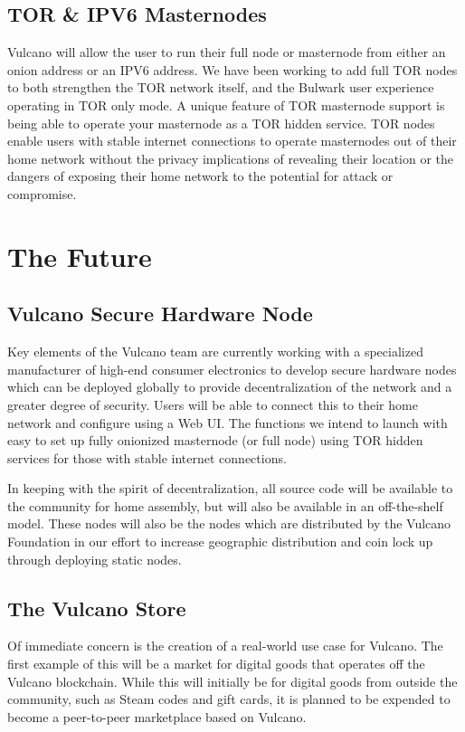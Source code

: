\documentclass[A4paper, 12pt]{article}
\begin{document}
\subsection{TOR \& IPV6 Masternodes}
Vulcano will allow the user to run their full node or masternode from either an onion address or an IPV6 address. We have been working to add full TOR nodes to both strengthen the TOR network itself, and the Bulwark user experience operating in TOR only mode. A unique feature of TOR masternode support is being able to operate your masternode as a TOR hidden service. TOR nodes enable users with stable internet connections to operate masternodes out of their home network without the privacy implications of revealing their location or the dangers of exposing their home network to the potential for attack or compromise.
 
\section{The Future}
\subsection{Vulcano Secure Hardware Node}
Key elements of the Vulcano team are currently working with a specialized manufacturer of high-end consumer electronics to develop secure hardware nodes which can be deployed globally to provide decentralization of the network and a greater degree of security. Users will be able to connect this to their home network and configure using a Web UI. The functions we intend to launch with easy to set up fully onionized masternode (or full node) using TOR hidden services for those with stable internet connections. 

In keeping with the spirit of decentralization, all source code will be available to the community for home assembly, but will also be available in an off-the-shelf model. These nodes will also be the nodes which are distributed by the Vulcano Foundation in our effort to increase geographic distribution and coin lock up through deploying static nodes. 

\subsection{The Vulcano Store}
Of immediate concern is the creation of a real-world use case for Vulcano. The first example of this will be a market for digital goods that operates off the Vulcano blockchain. While this will initially be for digital goods from outside the community, such as Steam codes and gift cards, it is planned to be expended to become a peer-to-peer marketplace based on Vulcano.
\end{document}
